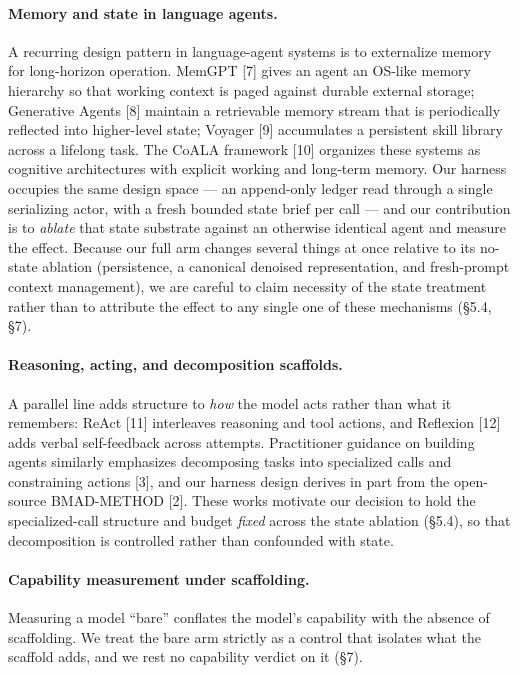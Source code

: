 \documentclass[11pt]{article}
\begin{document}
\paragraph{Memory and state in language agents.} A recurring design pattern in
language-agent systems is to externalize memory for long-horizon operation.
MemGPT [7] gives an agent an OS-like memory hierarchy so that working context
is paged against durable external storage; Generative Agents [8] maintain a
retrievable memory stream that is periodically reflected into higher-level
state; Voyager [9] accumulates a persistent skill library across a lifelong
task. The CoALA framework [10] organizes these systems as cognitive
architectures with explicit working and long-term memory. Our harness occupies
the same design space --- an append-only ledger read through a single
serializing actor, with a fresh bounded state brief per call --- and our
contribution is to \emph{ablate} that state substrate against an otherwise
identical agent and measure the effect. Because our full arm changes several
things at once relative to its no-state ablation (persistence, a canonical
denoised representation, and fresh-prompt context management), we are careful
to claim necessity of the state treatment rather than to attribute the effect
to any single one of these mechanisms (\S5.4, \S7).

\paragraph{Reasoning, acting, and decomposition scaffolds.} A parallel line
adds structure to \emph{how} the model acts rather than what it remembers:
ReAct [11] interleaves reasoning and tool actions, and Reflexion [12] adds
verbal self-feedback across attempts. Practitioner guidance on building agents
similarly emphasizes decomposing tasks into specialized calls and constraining
actions [3], and our harness design derives in part from the open-source
BMAD-METHOD [2]. These works motivate our decision to hold the specialized-call
structure and budget \emph{fixed} across the state ablation (\S5.4), so that
decomposition is controlled rather than confounded with state.

\paragraph{Capability measurement under scaffolding.} Measuring a model
``bare'' conflates the model's capability with the absence of scaffolding. We
treat the bare arm strictly as a control that isolates what the scaffold adds,
and we rest no capability verdict on it (\S7).
\end{document}
